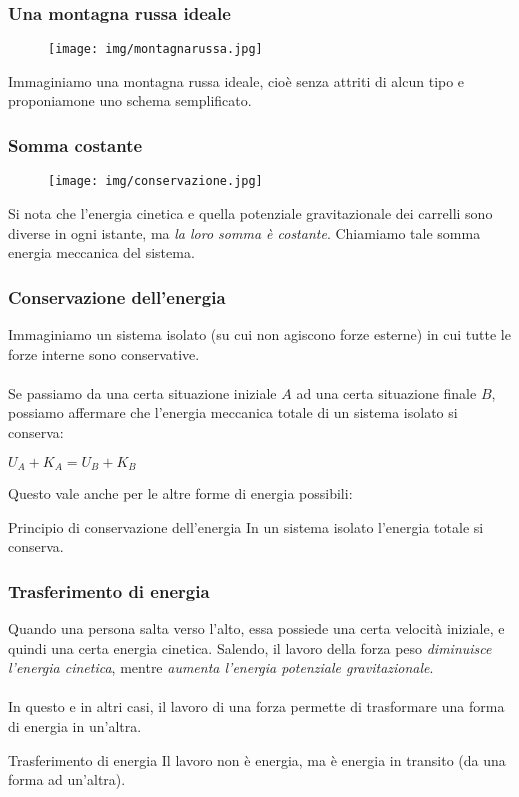 \documentclass[]{beamer}
\theoremstyle{plain}
\begin{document}
\begin{frame}
\frametitle{Una montagna russa ideale}
\begin{figure}
  \texttt{[image: img/montagnarussa.jpg]}
\end{figure}
Immaginiamo una montagna russa ideale, cioè senza attriti di alcun tipo e proponiamone uno schema semplificato.
\end{frame}



\begin{frame}
  \frametitle{Somma costante}
  \begin{figure}
  \texttt{[image: img/conservazione.jpg]}
\end{figure}\pause
Si nota che l'energia cinetica e quella potenziale gravitazionale dei carrelli sono diverse in ogni istante, ma \emph{la loro somma è costante}. Chiamiamo tale somma \alert{energia meccanica del sistema}.
\end{frame}


\begin{frame}
  \frametitle{Conservazione dell'energia}
  Immaginiamo un sistema isolato (su cui non agiscono forze esterne) in cui tutte le forze interne sono conservative.\\~\pause\\  
  Se passiamo da una certa situazione iniziale $ A $ ad una certa situazione finale $ B $, possiamo affermare che \alert<2>{l'energia meccanica totale di un sistema isolato si conserva}:
\begin{center}
\colorbox{blue!30}{$ U_A + K_A = U_B + K_B $}
\end{center}\pause
Questo vale anche per le altre forme di energia possibili:
\begin{block}{Principio di conservazione dell'energia}
  In un sistema isolato l'energia totale si conserva.
\end{block}
\end{frame}



\begin{frame}
\frametitle{Trasferimento di energia}
  Quando una persona salta verso l'alto, essa possiede una certa velocità iniziale, e quindi una certa energia cinetica. Salendo, il lavoro della forza peso \emph<1>{diminuisce l'energia cinetica}, mentre \emph<1>{aumenta l'energia potenziale gravitazionale}.\\~\pause\\In questo e in altri casi, \alert<2>{il lavoro di una forza permette di trasformare una forma di energia in un'altra}.\pause
\begin{block}{Trasferimento di energia}
Il lavoro non è energia, ma è energia in transito (da una forma ad un'altra).
\end{block}
\end{frame}
\end{document}
